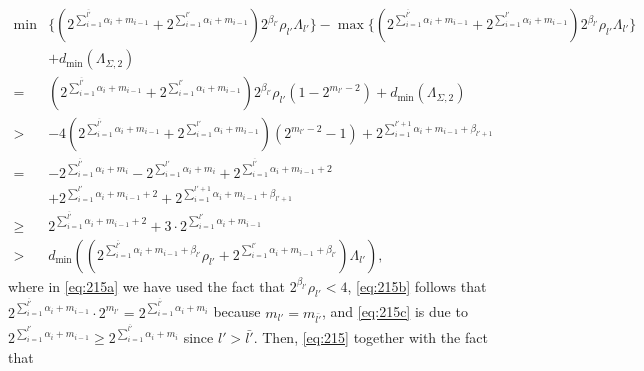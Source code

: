\documentclass[12pt, draftclsnofoot, onecolumn]{IEEEtran}
\theoremstyle{definition}
\begin{document}
\begin{subequations}\label{eq:215}
\begin{align}
\min&\{(2^{\sum_{i=1}^{\bar{l'}}\alpha_i+m_{i-1}}+2^{\sum_{i=1}^{l'}\alpha_i+m_{i-1}})2^{\beta_{l'}}\rho_{l'}\Lambda_{l'}\}-\max\{(2^{\sum_{i=1}^{\bar{l'}}\alpha_i+m_{i-1}}+2^{\sum_{i=1}^{l'}\alpha_i+m_{i-1}})2^{\beta_{l'}}\rho_{l'}\Lambda_{l'}\}\nonumber \\ & + d_{\min}(\Lambda_{\Sigma,2})\nonumber \\
 =& (2^{\sum_{i=1}^{\bar{l'}}\alpha_i+m_{i-1}}+2^{\sum_{i=1}^{l'}\alpha_i+m_{i-1}})2^{\beta_{l'}}\rho_{l'}(1-2^{m_{l'}-2})+d_{\min}(\Lambda_{\Sigma,2}) \nonumber \\
 >& -4(2^{\sum_{i=1}^{\bar{l'}}\alpha_i+m_{i-1}}+2^{\sum_{i=1}^{l'}\alpha_i+m_{i-1}})(2^{m_{l'}-2}-1)+2^{\sum_{i=1}^{l'+1}\alpha_i+m_{i-1}+\beta_{l'+1}} \label{eq:215a} \\
=& -2^{\sum_{i=1}^{\bar{l'}}\alpha_i+m_i}-2^{\sum_{i=1}^{l'}\alpha_i+m_i}+2^{\sum_{i=1}^{\bar{l'}}\alpha_i+m_{i-1}+2} \nonumber \\
&+2^{\sum_{i=1}^{l'}\alpha_i+m_{i-1}+2}+2^{\sum_{i=1}^{l'+1}\alpha_i+m_{i-1}+\beta_{l'+1}} \label{eq:215b} \\
\geq &2^{\sum_{i=1}^{\bar{l'}}\alpha_i+m_{i-1}+2}+3\cdot2^{\sum_{i=1}^{l'}\alpha_i+m_{i-1}}  \label{eq:215c}\\
>&d_{\min}\left((2^{\sum_{i=1}^{\bar{l'}}\alpha_i+m_{i-1}+\beta_{l'}}\rho_{l'}+2^{\sum_{i=1}^{l'}\alpha_i+m_{i-1}+\beta_{l'}})\Lambda_{l'}\right),
\end{align}
\end{subequations}
where in \eqref{eq:215a} we have used the fact that $2^{\beta_{l'}}\rho_{l'}< 4$, \eqref{eq:215b} follows that $2^{\sum_{i=1}^{\bar{l'}}\alpha_i+m_{i-1}}\cdot2^{m_{l'}} = 2^{\sum_{i=1}^{\bar{l'}}\alpha_i+m_{i}}$ because $m_{l'} = m_{\bar{l'}}$, and \eqref{eq:215c} is due to $2^{\sum_{i=1}^{l'}\alpha_i+m_{i-1}}\geq2^{\sum_{i=1}^{\bar{l'}}\alpha_i+m_{i}}$ since $l'>\bar{l'}$. Then, \eqref{eq:215} together with the fact that
\end{document}
